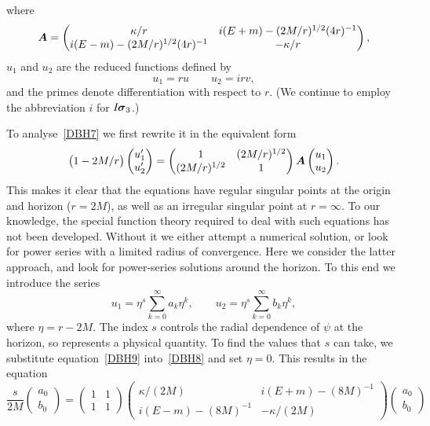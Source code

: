 \documentclass[a4paper]{article}
\numberwithin{equation}{section}
\newcommand{\eqv}{=}
\newcommand{\kap}{\kappa}
\newcommand{\sig}{\mbox{\boldmath $\sigma$}}
\newcommand{\bA}{\mbox{\boldmath $A$}}
\newcommand{\bsig}{\mbox{\boldmath $\sig$}}
\newcommand{\isk}{I \hspace{-1pt} \bsig_3}
\begin{document}
%
where
%
\begin{equation}
\bA \eqv 
\begin{pmatrix} \kap/r & i(E+m) - (2M/r)^{1/2}(4r)^{-1} \\ 
i(E-m) - (2M/r)^{1/2}(4r)^{-1} & - \kap/r \end{pmatrix},
\end{equation} 
%
$u_1$ and $u_2$ are the reduced functions defined by
%
\begin{equation}
u_1 = ru \qquad u_2 = i r v,
\end{equation}
%
and the primes denote differentiation with respect to $r$.  (We
continue to employ the abbreviation $i$ for $\isk$.)


To analyse~\eqref{DBH7} we first rewrite it in the equivalent form
%
\begin{equation}
\bigl(1-2M/r \bigr)
\begin{pmatrix} u_1' \\ u_2' \end{pmatrix} 
= \begin{pmatrix} 1 & (2M/r)^{1/2}  \\ (2M/r)^{1/2} & 1 
\end{pmatrix} \bA \begin{pmatrix} u_1 \\ u_2 \end{pmatrix}.
\label{DBH8}
\end{equation} 
%
This makes it clear that the equations have regular singular points at
the origin and horizon ($r=2M$), as well as an irregular singular
point at $r=\infty$.  To our knowledge, the special function theory
required to deal with such equations has not been developed.  Without
it we either attempt a numerical solution, or look for power series
with a limited radius of convergence.  Here we consider the latter
approach, and look for power-series solutions around the horizon.  To
this end we introduce the series
%
\begin{equation}
u_1 = \eta^s \sum_{k=0}^{\infty} a_k \eta^k, 
\qquad u_2 = \eta^s \sum_{k=0}^{\infty} b_k \eta^k, 
\label{DBH9}
\end{equation}	
%
where $\eta = r-2M$.  The index $s$ controls the radial dependence of
$\psi$ at the horizon, so represents a physical quantity.  To
find the values that $s$ can take, we substitute equation~\eqref{DBH9}
into~\eqref{DBH8} and set $\eta=0$.  This results in the equation
%
\begin{equation}
\frac{s}{2M}
\begin{pmatrix} a_0 \\ b_0 \end{pmatrix} 
= 
\begin{pmatrix} 1 & 1  \\ 1 & 1 \end{pmatrix}
\begin{pmatrix} \kap/(2M) & i(E+m) - (8M)^{-1} \\
i(E-m) - (8M)^{-1} & - \kap/(2M) \end{pmatrix}
\begin{pmatrix} a_0 \\ b_0 \end{pmatrix}
\end{equation}  
\end{document}
